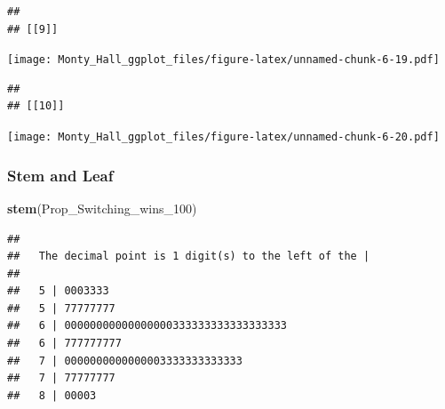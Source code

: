 \documentclass[
]{article}
\newenvironment{Shaded}{\begin{snugshade}}{\end{snugshade}}
\newcommand{\DecValTok}[1]{\textcolor[rgb]{0.00,0.00,0.81}{#1}}
\newcommand{\KeywordTok}[1]{\textcolor[rgb]{0.13,0.29,0.53}{\textbf{#1}}}
\newcommand{\NormalTok}[1]{#1}
\newcommand{\OperatorTok}[1]{\textcolor[rgb]{0.81,0.36,0.00}{\textbf{#1}}}
\newcommand{\StringTok}[1]{\textcolor[rgb]{0.31,0.60,0.02}{#1}}
\begin{document}
\begin{verbatim}
## 
## [[9]]
\end{verbatim}

\texttt{[image: Monty\_Hall\_ggplot\_files/figure-latex/unnamed-chunk-6-19.pdf]}

\begin{verbatim}
## 
## [[10]]
\end{verbatim}

\texttt{[image: Monty\_Hall\_ggplot\_files/figure-latex/unnamed-chunk-6-20.pdf]}

\begin{Shaded}
\end{Shaded}

\hypertarget{stem-and-leaf}{%
\subsubsection{Stem and Leaf}\label{stem-and-leaf}}

\begin{Shaded}
\begin{Highlighting}[]
\KeywordTok{stem}\NormalTok{(Prop_Switching_wins_}\DecValTok{100}\NormalTok{)}
\end{Highlighting}
\end{Shaded}

\begin{verbatim}
## 
##   The decimal point is 1 digit(s) to the left of the |
## 
##   5 | 0003333
##   5 | 77777777
##   6 | 00000000000000000333333333333333333
##   6 | 777777777
##   7 | 0000000000000003333333333333
##   7 | 77777777
##   8 | 00003
\end{verbatim}
\end{document}
